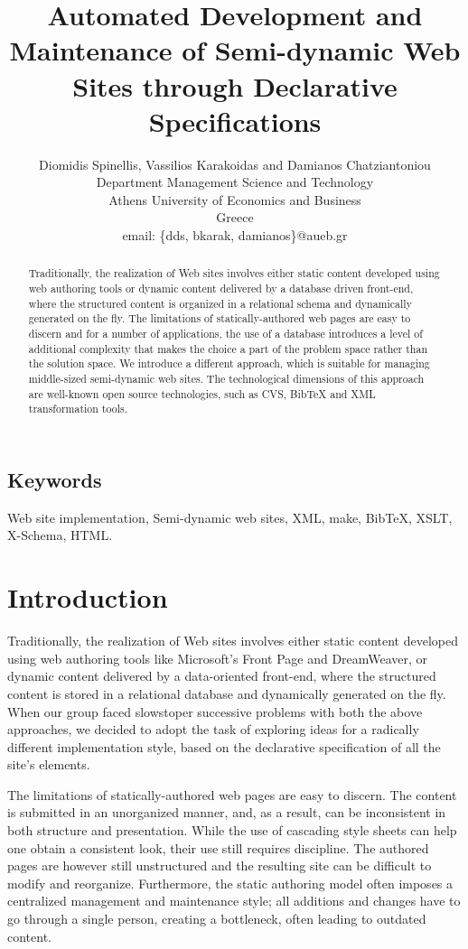 \documentclass[10pt]{article}
\title{Automated Development and Maintenance of Semi-dynamic Web Sites through Declarative Specifications}
\author{Diomidis Spinellis, Vassilios Karakoidas and Damianos Chatziantoniou\\
Department Management Science and Technology\\
Athens University of Economics and Business\\
Greece\\
email: \{dds, bkarak, damianos\}@aueb.gr}
\date{}
\begin{document}
\maketitle

\begin{abstract}
\noindent
Traditionally, the realization of Web sites involves either
static content developed using web authoring tools or dynamic
content delivered by a database driven front-end,
where the structured content is organized
in a relational schema and dynamically generated on the fly.
The limitations of statically-authored web pages are easy to discern and
for a number of applications, the use of a database
introduces a level of additional complexity that
makes the choice a part of the problem space rather than the solution space.
We introduce a different approach, which is suitable for managing 
middle-sized semi-dynamic web sites. The technological dimensions of this
approach are well-known open source technologies, such as {\sc CVS}, BibTeX 
and {\sc XML} transformation tools.
\end{abstract}

\subsection*{Keywords}
Web site implementation, Semi-dynamic web sites, {\sc XML}, make, BibTeX, {\sc XSLT}, X-Schema, {\sc HTML}.

\section{Introduction}
\label{sec:intro}
Traditionally, the realization of Web sites involves either
static content developed using web authoring tools like
Microsoft's Front Page and DreamWeaver, or dynamic
content delivered by a data-oriented front-end,
where the structured content is stored in a relational database 
and dynamically generated on the fly.
When our group faced slowstoper successive problems with both the above approaches,
we decided to adopt the task of exploring ideas for a radically different
implementation style, based on the declarative specification
of all the site's elements.

The limitations of statically-authored web pages are easy to discern.
The content is submitted in an unorganized manner, and, as a result,
can be inconsistent in both structure and presentation.
While the use of cascading style sheets can help one obtain a
consistent look, their use still requires discipline.
The authored pages are however still unstructured and the resulting
site can be difficult to modify and reorganize.
Furthermore, the static authoring model often imposes a centralized
management and maintenance style;
all additions and changes have to go through a single person,
creating a bottleneck, often leading to outdated content.
\end{document}
